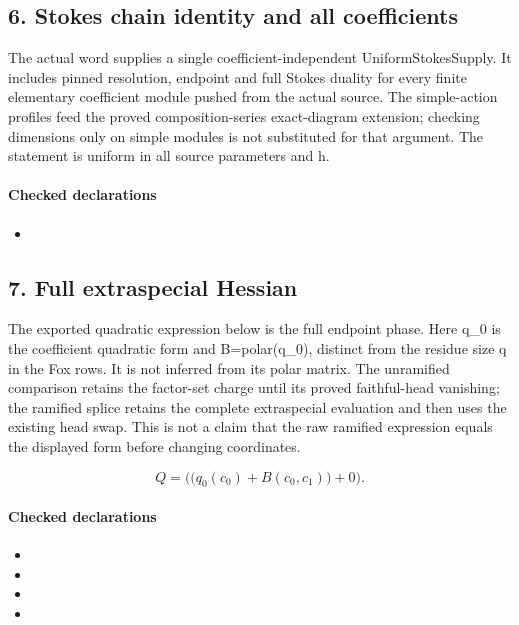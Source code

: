 \subsection*{6. Stokes chain identity and all coefficients}
The actual word supplies a single coefficient-independent UniformStokesSupply. It includes pinned resolution, endpoint and full Stokes duality for every finite elementary coefficient module pushed from the actual source. The simple-action profiles feed the proved composition-series exact-diagram extension; checking dimensions only on simple modules is not substituted for that argument. The statement is uniform in all source parameters and h.

\paragraph{Checked declarations}
\begin{itemize}
\item {}
\end{itemize}

\subsection*{7. Full extraspecial Hessian}
The exported quadratic expression below is the full endpoint phase. Here q\_0 is the coefficient quadratic form and B=polar(q\_0), distinct from the residue size q in the Fox rows. It is not inferred from its polar matrix. The unramified comparison retains the factor-set charge until its proved faithful-head vanishing; the ramified splice retains the complete extraspecial evaluation and then uses the existing head swap. This is not a claim that the raw ramified expression equals the displayed form before changing coordinates.

\[Q=\bigl(\bigl(q_0(c_0)+B(c_0,c_1)\bigr)+0\bigr).\]
\paragraph{Checked declarations}
\begin{itemize}
\item {}
\item {}
\item {}
\item {}
\end{itemize}

